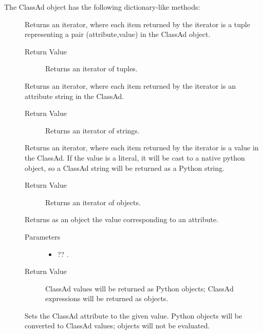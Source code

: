 The ClassAd object has the following dictionary-like methods:
\begin{description}

\item []
  Returns an iterator, where each item returned by the iterator 
  is a tuple representing a pair (attribute,value) in the ClassAd object.

  \begin{description}
    \item[ Return Value]
      Returns an iterator of tuples.
  \end{description}  

\item []
  Returns an iterator, where each item returned by the iterator 
  is an attribute string in the ClassAd.

  \begin{description}
    \item[ Return Value]
      Returns an iterator of strings.
  \end{description}  

\item []
  Returns an iterator, where each item returned by the iterator is a value 
  in the ClassAd.  If the value is a literal, 
  it will be cast to a native python object, 
  so a ClassAd string will be returned as a Python string.
  \begin{description}
    \item[ Return Value]
      Returns an iterator of objects.
  \end{description}  

\item []
  Returns as an object the value corresponding to an attribute.

  \begin{description}
    \item[ Parameters]
    \begin{itemize}
      \item {} ?? . 
    \end{itemize}
    \item[ Return Value]
      ClassAd values will be returned as Python objects; 
      ClassAd expressions will be returned as  objects.
  \end{description}  

\item []
  Sets the ClassAd attribute to the given value.
  Python objects will be converted to ClassAd values; 
   objects will not be evaluated.


\end{description}
